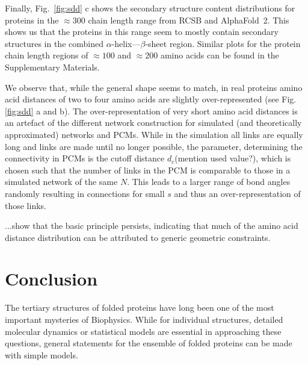 \documentclass[
reprint,
twocolumn,
amsmath,amssymb,superscriptaddress,aps,
pre]{revtex4-1}
\newcommand{\red}[1]{\textcolor{red!80!black}{#1}}
\newcommand{\blue}[1]{\textcolor{blue!80!black}{#1}}
\begin{document}
Finally, Fig.~\ref{fig:sdd} c shows the secondary structure content distributions for proteins in the $\approx300$ chain length range from RCSB and AlphaFold~2. This shows us that the proteins in this range seem to mostly contain secondary structures in the combined $\alpha$-helix---$\beta$-sheet region. Similar plots for the protein chain length regions of $\approx100$ and $\approx200$ amino acids can be found in the Supplementary Materials.




We observe that, while the general shape seems to match, in real proteins amino acid distances of two to four amino acids are slightly over-represented (see Fig.\ref{fig:sdd} a and b).
The over-representation of very short amino acid distances is an artefact of the different network construction for simulated (and theoretically approximated) networks and PCMs. While in the simulation all links are equally long and links are made until no longer possible, the parameter, determining the connectivity in PCMs is the cutoff distance $d_c$\blue{(mention used value?)}, which is chosen such that the number of links in the PCM is comparable to those in a simulated network of the same $N$. This leads to a larger range of bond angles randomly resulting in connections for small $s$ and thus an over-representation of those links.



\red{...show that the basic principle persists, indicating that much of the amino acid distance distribution can be attributed to generic geometric constraints.}

\section{Conclusion}
The tertiary structures of folded proteins have long been one of the most important mysteries of Biophysics. While for individual structures, detailed molecular dynamics or statistical models are essential in approaching these questions, general statements for the ensemble of folded proteins can be made with simple models.
\end{document}
